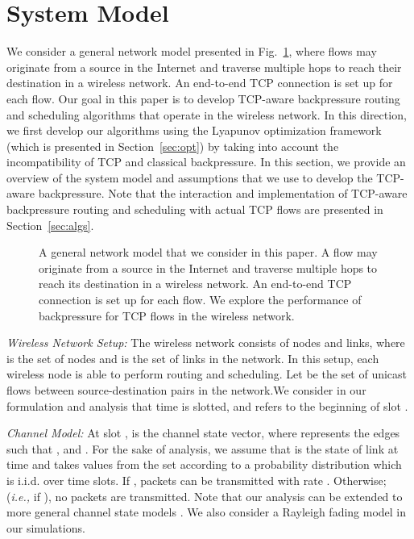 \documentclass[conference]{IEEEtran}
\newcommand{\ie}{{\em i.e., }}
\begin{document}
\section{System Model}\label{sec:system}
We consider a general network model presented in Fig.~\ref{fig:main-example}, where flows may originate from a source in the Internet and traverse multiple hops to reach their destination in a wireless network. An end-to-end TCP connection is set up for each flow.
Our goal in this paper is to develop TCP-aware backpressure routing and scheduling algorithms that operate in the wireless network. In this direction, we first develop our algorithms using the Lyapunov optimization framework (which is presented in Section~\ref{sec:opt}) by taking into account the incompatibility of TCP and classical backpressure. In this section, we provide an overview of the system model and assumptions that we use to develop the TCP-aware backpressure. Note that the interaction and implementation of TCP-aware backpressure routing and scheduling with actual TCP flows are presented in Section~\ref{sec:algs}.

\begin{figure}
\vspace{-10pt}
\centering
{}
\vspace{-5pt}
\caption{\scriptsize A general network model that we consider in this paper. A flow may originate from a source in the Internet and traverse multiple hops to reach its destination in a wireless network. An end-to-end TCP connection is set up for each flow. We explore the performance of backpressure for TCP flows in the wireless network.}
\label{fig:main-example}
\vspace{-20pt}
\end{figure}


{\em Wireless Network Setup:} The wireless network consists of  nodes and  links, where  is the set of nodes and  is the set of links in the network. In this setup, each wireless node is able to perform routing and scheduling. Let  be the set of unicast flows between source-destination pairs in the network.We consider in our formulation and analysis that time is slotted, and  refers to the beginning of slot .

{\em Channel Model:} At slot ,      is the channel state vector, where  represents the edges such that ,  and . For the sake of analysis, we assume that  is the state of link  at time  and takes values from the set  according to a probability distribution which is i.i.d. over time slots. If  , packets can be transmitted with rate . Otherwise; (\ie if ), no packets are transmitted. Note that our analysis can be extended to more general channel state models \cite{neely_book}. We also consider a Rayleigh fading model in our simulations.
\end{document}
